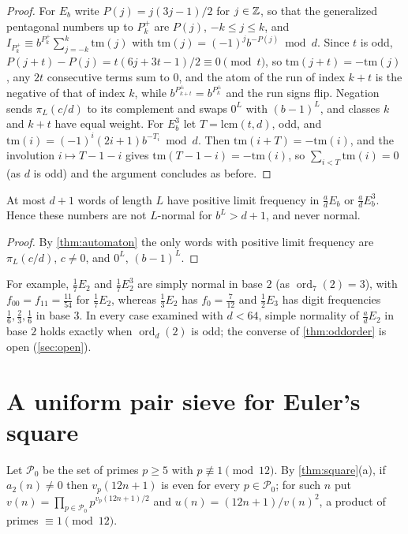 \documentclass[11pt]{article}
\DeclareMathOperator{\ord}{ord}
\begin{document}
\begin{proof}
For $E_b$ write $P(j)=j(3j-1)/2$ for $j\in\mathbb Z$, so that the generalized pentagonal numbers up to $P_k^+$
are $P(j)$, $-k\le j\le k$, and $I_{P_k^+}\equiv b^{P_k^+}\sum_{j=-k}^k\mathrm{tm}(j)$ with
$\mathrm{tm}(j)=(-1)^jb^{-P(j)}\bmod d$. Since $t$ is odd, $P(j+t)-P(j)=t(6j+3t-1)/2\equiv0\pmod t$,
so $\mathrm{tm}(j+t)=-\mathrm{tm}(j)$, any $2t$ consecutive terms sum to $0$, and the atom of the run
of index $k+t$ is the negative of that of index $k$, while $b^{P_{k+t}^\pm}=b^{P_k^\pm}$ and the run
signs flip. Negation sends $\pi_L(c/d)$ to its complement and swaps $0^L$ with $(b-1)^L$, and classes
$k$ and $k+t$ have equal weight. For $E_b^3$ let $T=\mathrm{lcm}(t,d)$, odd, and
$\mathrm{tm}(i)=(-1)^i(2i+1)b^{-T_i}\bmod d$. Then $\mathrm{tm}(i+T)=-\mathrm{tm}(i)$, and the
involution $i\mapsto T-1-i$ gives $\mathrm{tm}(T-1-i)=-\mathrm{tm}(i)$, so $\sum_{i<T}\mathrm{tm}(i)=0$
(as $d$ is odd) and the argument concludes as before.
\end{proof}

\begin{proposition}\label{prop:nohigher}
At most $d+1$ words of length $L$ have positive limit frequency in $\frac adE_b$ or $\frac adE_b^3$.
Hence these numbers are not $L$-normal for $b^L>d+1$, and never normal.
\end{proposition}

\begin{proof}
By \cref{thm:automaton} the only words with positive limit frequency are $\pi_L(c/d)$, $c\ne0$, and
$0^L$, $(b-1)^L$.
\end{proof}

For example, $\frac17E_2$ and $\frac17E_2^3$ are simply normal in base $2$ (as $\ord_7(2)=3$), with
$f_{00}=f_{11}=\frac{11}{54}$ for $\frac17E_2$, whereas $\frac13E_2$ has $f_0=\frac7{12}$ and
$\frac12E_3$ has digit frequencies $\frac16,\frac23,\frac16$ in base $3$. In every case examined with
$d<64$, simple normality of $\frac adE_2$ in base $2$ holds exactly when $\ord_d(2)$ is odd; the
converse of \cref{thm:oddorder} is open (\cref{sec:open}).

\section{A uniform pair sieve for Euler's square}\label{sec:sieve}

Let $\mathcal P_0$ be the set of primes $p\ge5$ with $p\not\equiv1\pmod{12}$. By \cref{thm:square}(a),
if $a_2(n)\ne0$ then $v_p(12n+1)$ is even for every $p\in\mathcal P_0$; for such $n$ put
$v(n)=\prod_{p\in\mathcal P_0}p^{v_p(12n+1)/2}$ and $u(n)=(12n+1)/v(n)^2$, a product of primes
$\equiv1\pmod{12}$.
\end{document}
